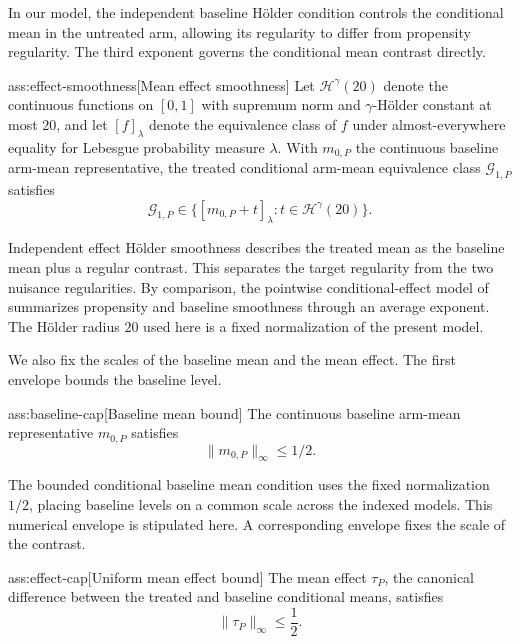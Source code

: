 In our model, the independent baseline Hölder condition controls the conditional mean in the untreated arm, allowing its regularity to differ from propensity regularity. The third exponent governs the conditional mean contrast directly.

\begin{assumptionv}{ass:effect-smoothness}[Mean effect smoothness]
Let \(\mathcal H^\gamma(20)\) denote the continuous functions on \([0,1]\) with supremum norm and \(\gamma\)-Hölder constant at most \(20\), and let \([f]_\lambda\) denote the equivalence class of \(f\) under almost-everywhere equality for Lebesgue probability measure \(\lambda\). With \(m_{0,P}\) the continuous baseline arm-mean representative, the treated conditional arm-mean equivalence class \(\mathcal G_{1,P}\) satisfies
\[
\mathcal G_{1,P}\in\{[m_{0,P}+t]_\lambda:t\in\mathcal H^\gamma(20)\}.
\]
\end{assumptionv}

Independent effect Hölder smoothness describes the treated mean as the baseline mean plus a regular contrast. This separates the target regularity from the two nuisance regularities. By comparison, the pointwise conditional-effect model of \citet[Sections 2--3]{KennedyBalakrishnanRobinsWasserman2024MinimaxCATE} summarizes propensity and baseline smoothness through an average exponent. The Hölder radius \(20\) used here is a fixed normalization of the present model.

We also fix the scales of the baseline mean and the mean effect. The first envelope bounds the baseline level.

\begin{assumptionv}{ass:baseline-cap}[Baseline mean bound]
The continuous baseline arm-mean representative \(m_{0,P}\) satisfies
\[
\|m_{0,P}\|_\infty\le1/2.
\]
\end{assumptionv}

The bounded conditional baseline mean condition uses the fixed normalization \(1/2\), placing baseline levels on a common scale across the indexed models. This numerical envelope is stipulated here. A corresponding envelope fixes the scale of the contrast.

\begin{assumptionv}{ass:effect-cap}[Uniform mean effect bound]
The mean effect \(\tau_P\), the canonical difference between the treated and baseline conditional means, satisfies
\[
\|\tau_P\|_\infty\le \frac12.
\]
\end{assumptionv}

